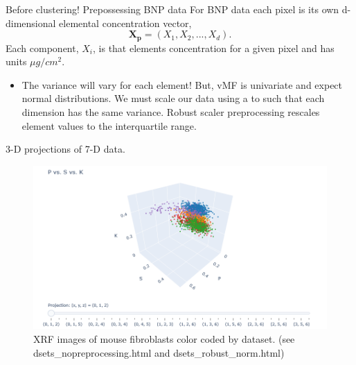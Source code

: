 \documentclass[
]{beamer}
\begin{document}
\begin{frame}{Before clustering! Prepossessing BNP data}
For BNP data each pixel is its own d-dimensional elemental concentration vector, 
$$\boldsymbol{X_p} = (X_1, X_2, ..., X_d).$$
Each component, $X_i$, is that elements concentration for a given pixel and has units $\mu g/cm^2$. 

\begin{itemize}
    \item The variance will vary for each element! But, vMF is univariate and expect normal distributions. We must scale our data using a to such that each dimension has the same variance. Robust scaler preprocessing rescales element values to the interquartile range.
\end{itemize}
    
\end{frame}

\begin{frame}{3-D projections of 7-D data.}
\begin{figure}[h]
  \includegraphics[width=1\textwidth,height=1\textheight,keepaspectratio]{7dto3d.png}
  \caption{XRF images of mouse fibroblasts color coded by dataset. (see dsets\_nopreprocessing.html and dsets\_robust\_norm.html)}
\end{figure}
\end{frame}
\end{document}
